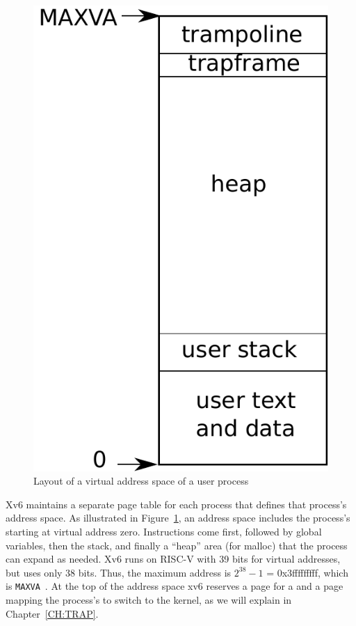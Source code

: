 \begin{figure}[t]
\centering
\includegraphics[scale=0.5]{fig/as.pdf}
\caption{Layout of a virtual address space of a user process}
\label{fig:as}
\end{figure}

Xv6 maintains a separate page table for each process that defines that process's
address space. As illustrated in 
Figure~\ref{fig:as},
an address space includes the process's
starting at virtual address zero. Instructions come first,
followed by global variables, then the stack,
and finally a ``heap'' area (for malloc)
that the process can expand as needed.
Xv6 runs on RISC-V with 39 bits for virtual addresses,
but uses only 38 bits.  Thus, the maximum address is $2^{38}-1$ =
0x3fffffffff, which is \lstinline{MAXVA}~.
At the top of the address space xv6 reserves a page
for a  and a page mapping
the process's 
to switch to the kernel, as we will explain in Chapter~\ref{CH:TRAP}.

